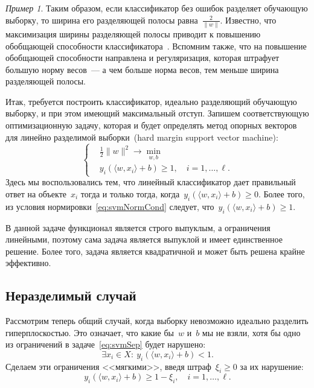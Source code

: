 \documentclass[a4paper, 12pt]{article}
\theoremstyle{plain} %
\theoremstyle{definition} %
\theoremstyle{remark} %
\newtheorem{example}{Пример}
\begin{document}
\begin{example}
Таким образом, если классификатор без ошибок разделяет обучающую выборку,
то ширина его разделяющей полосы равна~$\frac{2}{\|w\|}$.
Известно, что максимизация ширины разделяющей полосы приводит
к повышению обобщающей способности классификатора~\cite{mohri12foundations}.
Вспомним также, что на повышение обобщающей способности направлена и регуляризация,
которая штрафует большую норму весов~--- а чем больше норма весов,
тем меньше ширина разделяющей полосы.

Итак, требуется построить классификатор, идеально разделяющий обучающую выборку,
и при этом имеющий максимальный отступ.
Запишем соответствующую оптимизационную задачу,
которая и будет определять метод опорных векторов для линейно разделимой выборки~(hard margin support vector machine):
\begin{equation}
\label{eq:svmSep}
    \left\{
        \begin{aligned}
            & \frac{1}{2} \|w\|^2 \to \min_{w, b} \\
            & y_i \left(
                \langle w, x_i \rangle + b
            \right) \geq 1, \quad i = 1, \dots, \ell.
        \end{aligned}
    \right.
\end{equation}
Здесь мы воспользовались тем, что линейный классификатор дает правильный ответ
на объекте~$x_i$ тогда и только тогда, когда~$y_i (\langle w, x_i \rangle + b) \geq 0$.
Более того, из условия нормировки~\eqref{eq:svmNormCond} следует,
что~$y_i (\langle w, x_i \rangle + b) \geq 1$.

В данной задаче функционал является строго выпуклым, а ограничения линейными,
поэтому сама задача является выпуклой и имеет единственное решение.
Более того, задача является квадратичной и может быть решена крайне эффективно.

\subsection{Неразделимый случай}
Рассмотрим теперь общий случай, когда выборку
невозможно идеально разделить гиперплоскостью.
Это означает, что какие бы~$w$ и~$b$ мы не взяли,
хотя бы одно из ограничений в задаче~\eqref{eq:svmSep}
будет нарушено:
\[
    \exists x_i \in X:\
    y_i \left(
        \langle w, x_i \rangle + b
    \right) < 1.
\]
Сделаем эти ограничения <<мягкими>>, введя штраф~$\xi_i \geq 0$ за их нарушение:
\[
    y_i \left(
        \langle w, x_i \rangle + b
    \right) \geq 1 - \xi_i, \quad i = 1, \dots, \ell.
\]


\end{example}
\end{document}
